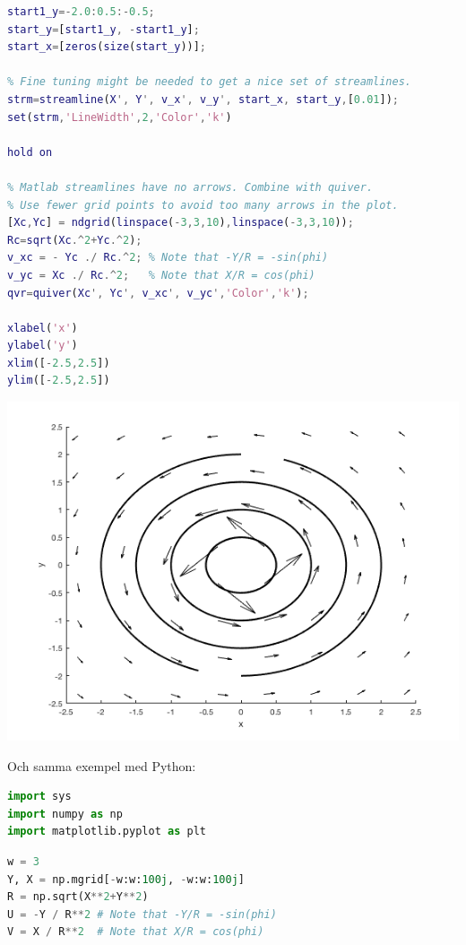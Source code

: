 \documentclass[%
oneside,                 %
final,                   %
10pt]{article}
\newenvironment{notice_mdfboxadmon}[1][]{
\begin{notice_mdfboxmdframed}[frametitle=#1]
}
{
\end{notice_mdfboxmdframed}
}
\begin{document}
\begin{notice_mdfboxadmon}
\begin{lstlisting}[language=Matlab,style=blue1]
% In Matlab we have to provide start points for streamlines.
start1_y=-2.0:0.5:-0.5;
start_y=[start1_y, -start1_y];
start_x=[zeros(size(start_y))];

% Fine tuning might be needed to get a nice set of streamlines.
strm=streamline(X', Y', v_x', v_y', start_x, start_y,[0.01]);
set(strm,'LineWidth',2,'Color','k')

hold on

% Matlab streamlines have no arrows. Combine with quiver.
% Use fewer grid points to avoid too many arrows in the plot.
[Xc,Yc] = ndgrid(linspace(-3,3,10),linspace(-3,3,10));
Rc=sqrt(Xc.^2+Yc.^2);
v_xc = - Yc ./ Rc.^2; % Note that -Y/R = -sin(phi)
v_yc = Xc ./ Rc.^2;   % Note that X/R = cos(phi)
qvr=quiver(Xc', Yc', v_xc', v_yc','Color','k');

xlabel('x')
ylabel('y')
xlim([-2.5,2.5])
ylim([-2.5,2.5])
\end{lstlisting}



\vspace{6mm}

\centerline{\includegraphics[width=0.8\linewidth]{fig/streamlines-vortex-matlab.png}}

\vspace{6mm}



Och samma exempel med Python:

\begin{lstlisting}[language=Python,style=blue1]
import sys
import numpy as np
import matplotlib.pyplot as plt
\end{lstlisting}
\begin{lstlisting}[language=Python,style=blue1]
w = 3
Y, X = np.mgrid[-w:w:100j, -w:w:100j]
R = np.sqrt(X**2+Y**2)
U = -Y / R**2 # Note that -Y/R = -sin(phi)
V = X / R**2  # Note that X/R = cos(phi)


\end{lstlisting}
\end{notice_mdfboxadmon}
\end{document}
